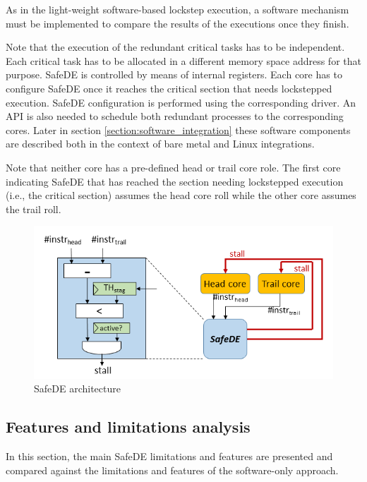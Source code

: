 As in the light-weight software-based lockstep execution, a software mechanism must be implemented to compare the results of the executions once they finish. 

Note that the execution of the redundant critical tasks has to be independent. Each critical task has to be allocated in a different memory space address for that purpose. SafeDE is controlled by means of internal registers. Each core has to configure SafeDE once it reaches the critical section that needs lockstepped execution. SafeDE configuration is performed using the corresponding driver. An API is also needed to schedule both redundant processes to the corresponding cores. Later in section \ref{section:software_integration} these software components are described both in the context of bare metal and Linux integrations.

Note that neither core has a pre-defined head or trail core role. The first core indicating SafeDE that has reached the section needing lockstepped execution (i.e., the critical section) assumes the head core roll while the other core assumes the trail roll.

\begin{figure}[h]
    \centering
    \includegraphics[scale=1]{img/SafeDE_HW.png}
    \caption{SafeDE architecture}
    \label{fig:SafeDE_Arch}
\end{figure}

\bigskip



\subsection{Features and limitations analysis}

In this section, the main SafeDE limitations and features are presented and compared against the limitations and features of the software-only approach.

